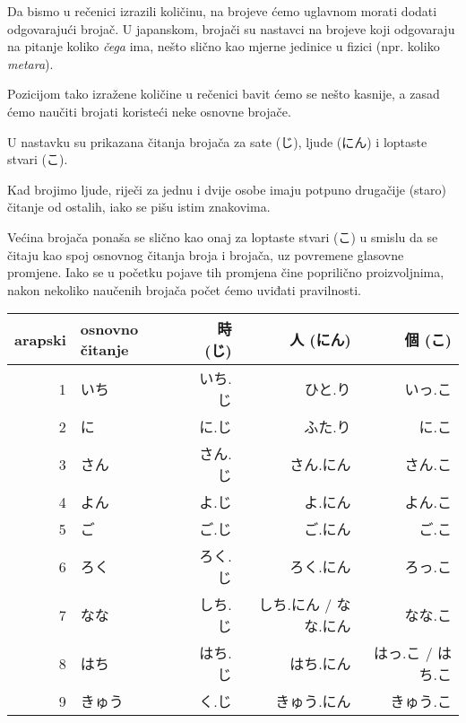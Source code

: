 	
	Da bismo u rečenici izrazili količinu, na brojeve ćemo uglavnom morati dodati odgovarajući brojač. U japanskom, brojači su nastavci na brojeve koji odgovaraju na pitanje koliko \textit{čega} ima, nešto slično kao mjerne jedinice u fizici (npr. koliko \textit{metara}).
	
	Pozicijom tako izražene količine u rečenici bavit ćemo se nešto kasnije, a zasad ćemo naučiti brojati koristeći neke osnovne brojače.
	
	\newpage
	
	U nastavku su prikazana čitanja brojača za sate (じ), ljude (にん) i loptaste stvari (こ).
	
	Kad brojimo ljude, riječi za jednu i dvije osobe imaju potpuno drugačije (staro) čitanje od ostalih, iako se pišu istim znakovima.
	
	Većina brojača ponaša se slično kao onaj za loptaste stvari (こ) u smislu da se čitaju kao spoj osnovnog čitanja broja i brojača, uz povremene glasovne promjene. Iako se u početku pojave tih promjena čine poprilično proizvoljnima, nakon nekoliko naučenih brojača počet ćemo uviđati pravilnosti.
	
	\begin{table}[h]
		\centering
		\begin{tabular}{r l r r r}\toprule[2pt]
			arapski & osnovno čitanje & 時 (じ) & 人 (にん) & 個 (こ)\\
			\midrule
			1			& いち & いち.じ & ひと.り\footnotemark[2] & \colorbox{blue!10}{いっ.こ} \\
			2			& に & に.じ & ふた.り\footnotemark[2] & に.こ \\
			3			& さん & さん.じ & さん.にん & さん.こ \\
			4			& よん & \colorbox{blue!10}{よ.じ} & \colorbox{blue!10}{よ.にん} & よん.こ \\
			5			& ご & ご.じ & ご.にん & ご.こ \\
			6			& ろく & ろく.じ & ろく.にん & \colorbox{blue!10}{ろっ.こ} \\
			7			& なな & \colorbox{blue!10}{しち.じ} & しち.にん / なな.にん & なな.こ \\
			8			& はち & はち.じ & はち.にん & \colorbox{blue!10}{はっ.こ} / はち.こ \\
			9			& きゅう & \colorbox{blue!10}{く.じ} & きゅう.にん & きゅう.こ \\
			\bottomrule
		\end{tabular}
	\end{table}

